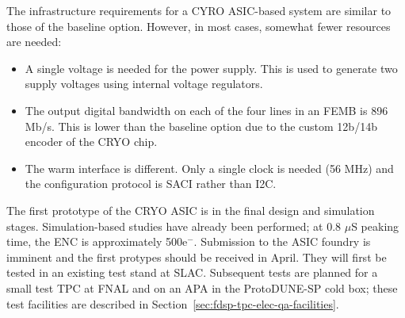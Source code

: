 The infrastructure requirements for a CYRO ASIC-based system are similar to those of the baseline option. However, in most cases, somewhat fewer resources are needed:
\begin{itemize}
\item{A single voltage is needed for the power supply. This is used to generate two supply voltages using internal voltage regulators.}
\item{The output digital bandwidth on each of the four lines in an FEMB is 896 Mb/s. This is lower than the baseline option due to the custom 12b/14b encoder of the CRYO chip. }
\item{The warm interface is different. Only a single clock is needed (56 MHz) and the configuration protocol is SACI rather than I2C. }
\end{itemize}

The first prototype of the CRYO ASIC is in the final design and simulation stages. Simulation-based studies have already been performed; at 0.8 $\mu$S peaking time, the ENC is approximately 500e$^-$.  Submission to the ASIC foundry is imminent and the first protypes should be received in April. They will first be tested in an existing test stand at SLAC. Subsequent tests are planned for a small test TPC at FNAL and on an APA in the ProtoDUNE-SP cold box; these test facilities are described in Section~\ref{sec:fdsp-tpc-elec-qa-facilities}.
